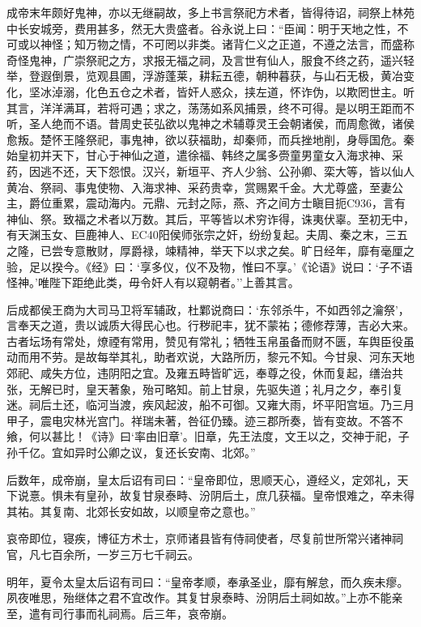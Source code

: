 \documentclass[]{article}
\begin{document}
成帝末年颇好鬼神，亦以无继嗣故，多上书言祭祀方术者，皆得待诏，祠祭上林苑中长安城旁，费用甚多，然无大贵盛者。谷永说上曰：``臣闻：明于天地之性，不可或以神怪；知万物之情，不可罔以非类。诸背仁义之正道，不遵之法言，而盛称奇怪鬼神，广崇祭祀之方，求报无福之祠，及言世有仙人，服食不终之药，遥兴轻举，登遐倒景，览观县圃，浮游蓬莱，耕耘五德，朝种暮获，与山石无极，黄冶变化，坚冰淖溺，化色五仓之术者，皆奸人惑众，挟左道，怀诈伪，以欺罔世主。听其言，洋洋满耳，若将可遇；求之，荡荡如系风捕景，终不可得。是以明王距而不听，圣人绝而不语。昔周史苌弘欲以鬼神之术辅尊灵王会朝诸侯，而周愈微，诸侯愈叛。楚怀王隆祭祀，事鬼神，欲以获福助，却秦师，而兵挫地削，身辱国危。秦始皇初并天下，甘心于神仙之道，遣徐福、韩终之属多赍童男童女入海求神、采药，因逃不还，天下怨恨。汉兴，新垣平、齐人少翁、公孙卿、栾大等，皆以仙人黄冶、祭祠、事鬼使物、入海求神、采药贵幸，赏赐累千金。大尤尊盛，至妻公主，爵位重累，震动海内。元鼎、元封之际，燕、齐之间方士瞋目扼C936，言有神仙、祭。致福之术者以万数。其后，平等皆以术穷诈得，诛夷伏辜。至初无中，有天渊玉女、巨鹿神人、EC40阳侯师张宗之奸，纷纷复起。夫周、秦之末，三五之隆，已尝专意散财，厚爵禄，竦精神，举天下以求之矣。旷日经年，靡有毫厘之验，足以揆今。《经》曰：`享多仪，仪不及物，惟曰不享。'《论语》说曰：`子不语怪神。'唯陛下距绝此类，毋令奸人有以窥朝者。''上善其言。

后成都侯王商为大司马卫将军辅政，杜鄴说商曰：`东邻杀牛，不如西邻之瀹祭'，言奉天之道，贵以诚质大得民心也。行秽祀丰，犹不蒙祐；德修荐薄，吉必大来。古者坛场有常处，燎禋有常用，赞见有常礼；牺牲玉帛虽备而财不匮，车舆臣役虽动而用不劳。是故每举其礼，助者欢说，大路所历，黎元不知。今甘泉、河东天地郊祀、咸失方位，违阴阳之宜。及雍五畤皆旷远，奉尊之役，休而复起，缮治共张，无解已时，皇天著象，殆可略知。前上甘泉，先驱失道；礼月之夕，奉引复迷。祠后土还，临河当渡，疾风起波，船不可御。又雍大雨，坏平阳宫垣。乃三月甲子，震电灾林光宫门。祥瑞未著，咎征仍臻。迹三郡所奏，皆有变故。不答不飨，何以甚比！《诗》曰`率由旧章'。旧章，先王法度，文王以之，交神于祀，子孙千亿。宜如异时公卿之议，复还长安南、北郊。''

后数年，成帝崩，皇太后诏有司曰：``皇帝即位，思顺天心，遵经义，定郊礼，天下说憙。惧未有皇孙，故复甘泉泰畤、汾阴后土，庶几获福。皇帝恨难之，卒未得其祐。其复南、北郊长安如故，以顺皇帝之意也。''

哀帝即位，寝疾，博征方术士，京师诸县皆有侍祠使者，尽复前世所常兴诸神祠官，凡七百余所，一岁三万七千祠云。

明年，夏令太皇太后诏有司曰：``皇帝孝顺，奉承圣业，靡有解怠，而久疾未瘳。夙夜唯思，殆继体之君不宜改作。其复甘泉泰畤、汾阴后土祠如故。''上亦不能亲至，遣有司行事而礼祠焉。后三年，哀帝崩。
\end{document}
